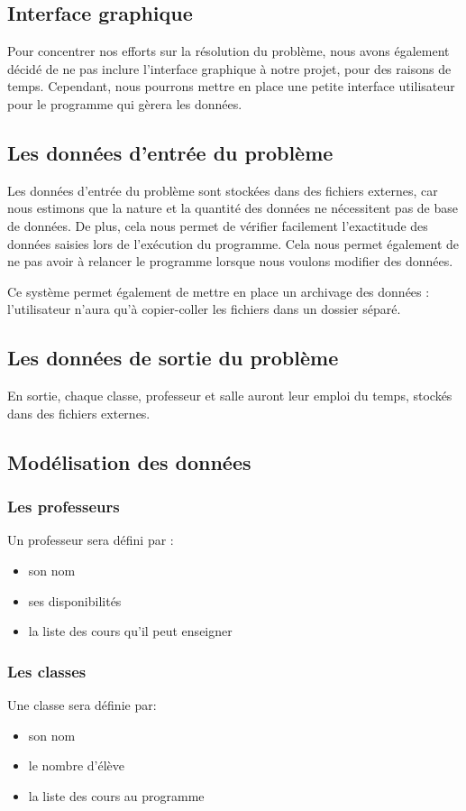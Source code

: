 \documentclass[12pt,a4paper,french]{article}
\begin{document}
\subsection{Interface graphique}
Pour concentrer nos efforts sur la résolution du problème, nous avons également décidé de ne pas inclure l'interface graphique à notre projet, pour des raisons de temps. Cependant, nous pourrons mettre en place une petite interface utilisateur pour le programme qui gèrera les données.

\subsection{Les données d'entrée du problème}
Les données d'entrée du problème sont stockées dans des fichiers externes, car nous estimons que la nature et la quantité des données ne nécessitent pas de base de données. De plus, cela nous permet de vérifier facilement l'exactitude des données saisies lors de l'exécution du programme. Cela nous permet également de ne pas avoir à relancer le programme lorsque nous voulons modifier des données.

Ce système permet également de mettre en place un archivage des données : l'utilisateur n'aura qu'à copier-coller les fichiers dans un dossier séparé.

\subsection{Les données de sortie du problème}
En sortie, chaque classe, professeur et salle auront leur emploi du temps, stockés dans des fichiers externes.

\subsection{Modélisation des données}
\subsubsection{Les professeurs}
Un professeur sera défini par :
\begin{itemize}
\item son nom
\item ses disponibilités
\item la liste des cours qu'il peut enseigner
\end{itemize}

\subsubsection{Les classes}
Une classe sera définie par:
\begin{itemize}
\item son nom
\item le nombre d'élève
\item la liste des cours au programme
\end{itemize}
\end{document}
